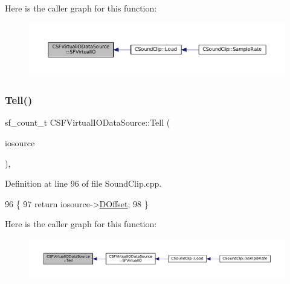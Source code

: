 Here is the caller graph for this function\+:\nopagebreak
\begin{figure}[H]
\begin{center}
\leavevmode
\includegraphics[width=350pt]{classCSFVirtualIODataSource_a9c15fbbe734fdfc2af17ca8f424b7e43_icgraph}
\end{center}
\end{figure}
\hypertarget{classCSFVirtualIODataSource_aae8e2b59f9753ed1f8baca1561b15962}{}\label{classCSFVirtualIODataSource_aae8e2b59f9753ed1f8baca1561b15962} 
\subsubsection{\texorpdfstring{Tell()}{Tell()}}
{\footnotesize\ttfamily sf\+\_\+count\+\_\+t C\+S\+F\+Virtual\+I\+O\+Data\+Source\+::\+Tell (\begin{DoxyParamCaption}\item[{\hyperlink{classCSFVirtualIODataSource}{C\+S\+F\+Virtual\+I\+O\+Data\+Source} $\ast$}]{iosource }\end{DoxyParamCaption})\hspace{0.3cm}{\ttfamily [static]}, {\ttfamily [protected]}}



Definition at line 96 of file Sound\+Clip.\+cpp.


\begin{DoxyCode}
96                                                                        \{
97     \textcolor{keywordflow}{return} iosource->\hyperlink{classCSFVirtualIODataSource_a29db7bf8a3a7103deacb80bf619919c8}{DOffset};
98 \}
\end{DoxyCode}
Here is the caller graph for this function\+:\nopagebreak
\begin{figure}[H]
\begin{center}
\leavevmode
\includegraphics[width=350pt]{classCSFVirtualIODataSource_aae8e2b59f9753ed1f8baca1561b15962_icgraph}
\end{center}
\end{figure}
\hypertarget{classCSFVirtualIODataSource_ac1d38c4c9d8ba3e0a2affd7dd72283ee}{}\label{classCSFVirtualIODataSource_ac1d38c4c9d8ba3e0a2affd7dd72283ee} 
